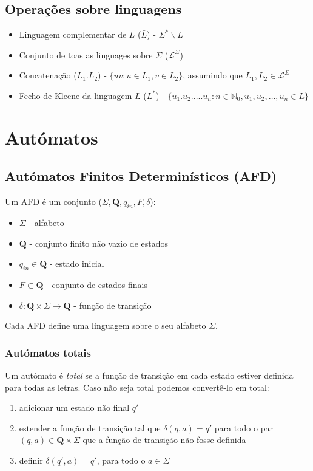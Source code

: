 \documentclass{article}
\begin{document}
\subsection{Operações sobre linguagens}

\begin{itemize}
    \item Linguagem complementar de $L$ ($\bar{L}$) - $\Sigma^*\backslash L$
    \item Conjunto de toas as linguages sobre $\Sigma$ ($\mathcal{L}^\Sigma$)
    \item Concatenação ($L_1.L_2$) - $\{uv : u \in L_1, v \in L_2\}$, assumindo que $L_1,L_2 \in \mathcal{L}^\Sigma$
    \item Fecho de Kleene da linguagem $L$ ($L^*$) - $\{u_1.u_2.\dots.u_n : n \in \mathbb{N}_0, u_1, u_2,\dots,u_n \in L\}$
\end{itemize}

\section{Autómatos}

\subsection{Autómatos Finitos Determinísticos (AFD)}

Um AFD é um conjunto ($\Sigma, \mathbf{Q}, q_{in}, F, \delta$):

\begin{itemize}
    \item $\Sigma$ - alfabeto
    \item $\mathbf{Q}$ - conjunto finito não vazio de estados
    \item $q_{in} \in \mathbf{Q}$ - estado inicial
    \item $F \subset \mathbf{Q}$ - conjunto de estados finais
    \item $\delta : \mathbf{Q} \times \Sigma \to \mathbf{Q}$ - função de transição
\end{itemize}

\noindent Cada AFD define uma linguagem sobre o seu alfabeto $\Sigma$.

\subsubsection{Autómatos totais}

Um autómato é \emph{total} se a função de transição em cada estado estiver definida para todas as letras.
Caso não seja total podemos convertê-lo em total:
\begin{enumerate}
    \item adicionar um estado não final $q'$
    \item estender a função de transição tal que $\delta(q,a) = q'$ para todo o par $(q,a) \in \mathbf{Q} \times \Sigma$ que a função de transição não fosse definida
    \item definir $\delta(q', a) = q'$, para todo o $a \in \Sigma$
\end{enumerate}
\end{document}
